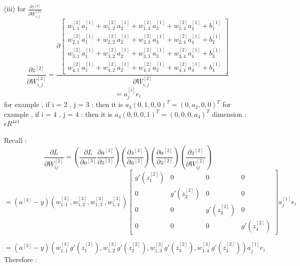 \documentclass{article}
\begin{document}
(iii) for \( \frac{\partial z^{[2]} }{\partial W_{i,j}^{[2]}} \) \newline
\[
\frac{\partial z^{[2]} }{\partial W_{i,j}^{[2]}}
=\frac{ \partial \begin{bmatrix}
w_{1,1}^{[2]}a_1^{[1]}+w_{1,2}^{[2]}a_2^{[1]}+w_{1,3}^{[2]}a_3^{[1]}+w_{1,4}^{[2]}a_4^{[1]} + b_1^{[1]}\\
w_{2,1}^{[2]}a_1^{[1]}+w_{2,2}^{[2]}a_2^{[1]}+w_{2,3}^{[2]}a_3^{[1]}+w_{2,4}^{[2]}a_4^{[1]} + b_2^{[1]}\\
w_{3,1}^{[2]}a_1^{[1]}+w_{3,2}^{[2]}a_2^{[1]}+w_{3,3}^{[2]}a_3^{[1]}+w_{3,4}^{[2]}a_4^{[1]} + b_3^{[1]}\\
w_{4,1}^{[2]}a_1^{[1]}+w_{4,2}^{[2]}a_2^{[1]}+w_{4,3}^{[2]}a_3^{[1]}+w_{4,4}^{[2]}a_4^{[1]} + b_4^{[1]}
\end{bmatrix} } {\partial W_{i,j}^{[2]}} 
\]
\[
= a_j^{[i]}e_i
\]
for example , if i = 2 , j = 3 : then it is \(a_3 (0,1,0,0)^T=(0,a_3,0,0)^T\) \newline
for example , if i = 4 , j = 4 : then it is \(a_4 (0,0,0,1)^T=(0,0,0,a_4)^T\) \newline
dimension :   \( \epsilon R^{4x1} \)  \newline \newline

Recall : 
\[
\frac{\partial L }{\partial W_{ij}^{[2]}} = ( \frac{\partial L }{\partial a^{[3]}} \frac{\partial a^{[3]}}{\partial z^{[3]}} )
(\frac{\partial z^{[3]}}{\partial a^{[2]}}) ( \frac{\partial a^{[2]}}{\partial z^{[2]}})( \frac{\partial z^{[2]}}{\partial W_{ij}^{[2]}})
\]
\[
=  (a^{[3]}-y) (w_{1,1}^{[3]},w_{1,2}^{[3]},w_{1,3}^{[3]},w_{1,4}^{[3]}) 
\begin{bmatrix}
 g'(z_1^{[2]}) & 0 & 0 & 0  \\ 
 0 & g'(z_2^{[2]}) & 0 & 0 \\ 
0 & 0 &  g'(z_3^{[2]}) &0 \\ 
 0 & 0 & 0 & g'(z_4^{[2]})
\end{bmatrix} 
 a_j^{[1]}e_i 
\]

\[
=  (a^{[3]}-y) (w_{1,1}^{[3]} g'(z_1^{[2]}),w_{1,2}^{[3]} g'(z_2^{[2]}),w_{1,3}^{[3]} g'(z_3^{[2]}),w_{1,4}^{[3]}g'(z_4^{[2]})) 
 a_j^{[1]}e_i 
\]
Therefore :
\end{document}
